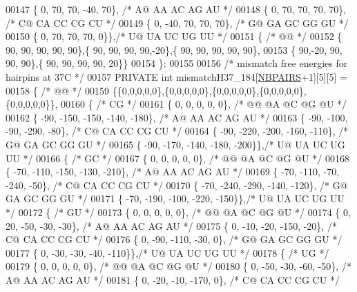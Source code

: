 \begin{DoxyCode}
00147    \{   0,   70,   70,  -40,   70\}, \textcolor{comment}{/* A@  AA  AC  AG  AU */}
00148    \{   0,   70,   70,   70,   70\}, \textcolor{comment}{/* C@  CA  CC  CG  CU */}
00149    \{   0,  -40,   70,   70,   70\}, \textcolor{comment}{/* G@  GA  GC  GG  GU */}
00150    \{   0,   70,   70,   70,    0\}\},\textcolor{comment}{/* U@  UA  UC  UG  UU */}
00151   \{ \textcolor{comment}{/* @@ */}
00152    \{ 90, 90, 90, 90, 90\},\{ 90, 90, 90, 90,-20\},\{ 90, 90, 90, 90, 90\},
00153    \{ 90,-20, 90, 90, 90\},\{ 90, 90, 90, 90, 20\}\}
00154 \};
00155 
00156 \textcolor{comment}{/* mismatch free energies for hairpins at 37C */}
00157 PRIVATE \textcolor{keywordtype}{int} mismatchH37\_184[\hyperlink{constants_8h_a5e75221c779d618eab81e096f37e32ce}{NBPAIRS}+1][5][5] =
00158 \{ \textcolor{comment}{/* @@ */}
00159   \{\{0,0,0,0,0\},\{0,0,0,0,0\},\{0,0,0,0,0\},\{0,0,0,0,0\},\{0,0,0,0,0\}\},
00160   \{ \textcolor{comment}{/* CG */}
00161    \{   0,    0,    0,    0,    0\}, \textcolor{comment}{/* @@  @A  @C  @G  @U */}
00162    \{ -90, -150, -150, -140, -180\}, \textcolor{comment}{/* A@  AA  AC  AG  AU */}
00163    \{ -90, -100,  -90, -290,  -80\}, \textcolor{comment}{/* C@  CA  CC  CG  CU */}
00164    \{ -90, -220, -200, -160, -110\}, \textcolor{comment}{/* G@  GA  GC  GG  GU */}
00165    \{ -90, -170, -140, -180, -200\}\},\textcolor{comment}{/* U@  UA  UC  UG  UU */}
00166   \{ \textcolor{comment}{/* GC */}
00167    \{   0,    0,    0,    0,    0\}, \textcolor{comment}{/* @@  @A  @C  @G  @U */}
00168    \{ -70, -110, -150, -130, -210\}, \textcolor{comment}{/* A@  AA  AC  AG  AU */}
00169    \{ -70, -110,  -70, -240,  -50\}, \textcolor{comment}{/* C@  CA  CC  CG  CU */}
00170    \{ -70, -240, -290, -140, -120\}, \textcolor{comment}{/* G@  GA  GC  GG  GU */}
00171    \{ -70, -190, -100, -220, -150\}\},\textcolor{comment}{/* U@  UA  UC  UG  UU */}
00172   \{ \textcolor{comment}{/* GU */}
00173    \{   0,    0,    0,    0,    0\}, \textcolor{comment}{/* @@  @A  @C  @G  @U */}
00174    \{   0,   20,  -50,  -30,  -30\}, \textcolor{comment}{/* A@  AA  AC  AG  AU */}
00175    \{   0,  -10,  -20, -150,  -20\}, \textcolor{comment}{/* C@  CA  CC  CG  CU */}
00176    \{   0,  -90, -110,  -30,    0\}, \textcolor{comment}{/* G@  GA  GC  GG  GU */}
00177    \{   0,  -30,  -30,  -40, -110\}\},\textcolor{comment}{/* U@  UA  UC  UG  UU */}
00178   \{ \textcolor{comment}{/* UG */}
00179    \{   0,    0,    0,    0,    0\}, \textcolor{comment}{/* @@  @A  @C  @G  @U */}
00180    \{   0,  -50,  -30,  -60,  -50\}, \textcolor{comment}{/* A@  AA  AC  AG  AU */}
00181    \{   0,  -20,  -10, -170,    0\}, \textcolor{comment}{/* C@  CA  CC  CG  CU */}

\end{DoxyCode}
